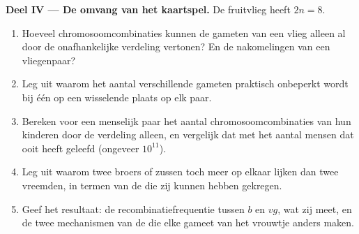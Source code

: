 \begin{problem}
\medskip
\noindent\textbf{Deel IV --- De omvang van het kaartspel.}
De fruitvlieg heeft $2n = 8$.
\begin{enumerate}[resume]
  \item Hoeveel chromosoomcombinaties kunnen de gameten van een vlieg
        alleen al door de onafhankelijke verdeling vertonen? En de
        nakomelingen van een vliegenpaar?
  \item Leg uit waarom het aantal verschillende gameten praktisch
        onbeperkt wordt bij één  op een wisselende plaats
        op elk paar.
  \item Bereken voor een menselijk paar het aantal chromosoomcombinaties
        van hun kinderen door de verdeling alleen, en vergelijk dat met
        het aantal mensen dat ooit heeft geleefd (ongeveer $10^{11}$).
  \item Leg uit waarom twee broers of zussen toch meer op elkaar lijken
        dan twee vreemden, in termen van de  die zij kunnen hebben
        gekregen.
  \item Geef het resultaat: de recombinatiefrequentie tussen $b$ en $vg$,
        wat zij meet, en de twee mechanismen van de  die elke
        gameet van het vrouwtje anders maken.
\end{enumerate}
\end{problem}
